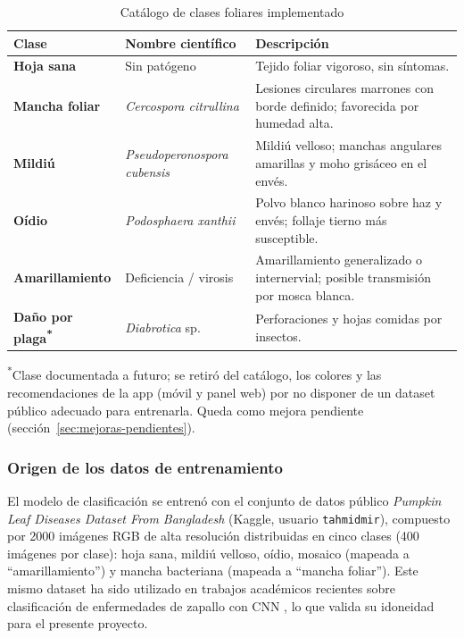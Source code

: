 \documentclass[12pt,a4paper]{article}
\begin{document}
\begin{table}[H]
\centering
\caption{Catálogo de clases foliares implementado}
\label{tab:enfermedades}
\renewcommand{\arraystretch}{1.4}
\begin{tabular}{>{\bfseries}p{3.2cm} p{4cm} p{6cm}}
\toprule
\normalfont\bfseries Clase & \bfseries\normalfont Nombre científico & \bfseries\normalfont Descripción \\
\midrule
Hoja sana & Sin patógeno & Tejido foliar vigoroso, sin síntomas. \\
Mancha foliar & \textit{Cercospora citrullina} & Lesiones circulares marrones con borde definido; favorecida por humedad alta. \\
Mildiú & \textit{Pseudoperonospora cubensis} & Mildiú velloso; manchas angulares amarillas y moho grisáceo en el envés. \\
Oídio & \textit{Podosphaera xanthii} & Polvo blanco harinoso sobre haz y envés; follaje tierno más susceptible. \\
Amarillamiento & Deficiencia / virosis & Amarillamiento generalizado o internervial; posible transmisión por mosca blanca. \\
Daño por plaga\textsuperscript{*} & \textit{Diabrotica} sp. & Perforaciones y hojas comidas por insectos. \\
\bottomrule
\end{tabular}
\end{table}
{\footnotesize\textsuperscript{*}Clase documentada a futuro; se retiró del
catálogo, los colores y las recomendaciones de la app (móvil y panel web) por
no disponer de un dataset público adecuado para entrenarla. Queda como mejora
pendiente (sección~\ref{sec:mejoras-pendientes}).}

\subsubsection{Origen de los datos de entrenamiento}

El modelo de clasificación se entrenó con el conjunto de datos público
\textit{Pumpkin Leaf Diseases Dataset From Bangladesh} (Kaggle, usuario
\texttt{tahmidmir}), compuesto por 2000 imágenes RGB de alta resolución
distribuidas en cinco clases (400 imágenes por clase): hoja sana, mildiú
velloso, oídio, mosaico (mapeada a ``amarillamiento'') y mancha bacteriana
(mapeada a ``mancha foliar''). Este mismo dataset ha sido utilizado en trabajos
académicos recientes sobre clasificación de enfermedades de zapallo con CNN
\cite{pumpkin2024, pumpkinxai2025}, lo que valida su idoneidad para el presente
proyecto.
\end{document}
